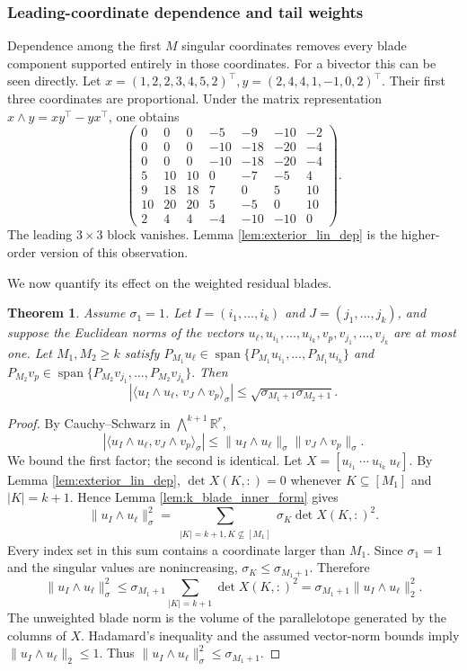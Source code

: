 \documentclass[11pt, preprint]{article}
\newtheorem{theorem}{Theorem}[section]
\newcommand{\R}{\mathbb{R}}
\newcommand{\inner}[1]{\langle #1\rangle}
\newcommand{\Span}{\operatorname{span}}
\begin{document}
\subsubsection{Leading-coordinate dependence and tail weights}

Dependence among the first $M$ singular coordinates removes every blade component supported entirely in those coordinates. For a bivector this can be seen directly. Let
\(
x=(1,2,2,3,4,5,2)^\top, 
y=(2,4,4,1,-1,0,2)^\top.
\)
Their first three coordinates are proportional. Under the matrix representation
$x\wedge y=xy^\top-yx^\top$, one obtains
\[
\begin{pmatrix}
0&0&0&-5&-9&-10&-2\\
0&0&0&-10&-18&-20&-4\\
0&0&0&-10&-18&-20&-4\\
5&10&10&0&-7&-5&4\\
9&18&18&7&0&5&10\\
10&20&20&5&-5&0&10\\
2&4&4&-4&-10&-10&0
\end{pmatrix}.
\]
The leading $3\times3$ block vanishes. Lemma \ref{lem:exterior_lin_dep} is the higher-order version of this observation.

We now quantify its effect on the weighted residual blades.

\begin{theorem}\label{thm:k_blade_inner_bound1}
Assume $\sigma_1=1$. Let $I=(i_1,\ldots,i_k)$ and $J=(j_1,\ldots,j_k)$, and suppose the Euclidean norms of the vectors
$u_\ell,u_{i_1},\ldots,u_{i_k},v_p,v_{j_1},\ldots,v_{j_k}$ are at most one. Let $M_1,M_2\geq k$ satisfy
\(P_{M_1}u_\ell\in\Span\{P_{M_1}u_{i_1},\ldots,P_{M_1}u_{i_k}\}\) and \(P_{M_2}v_p\in\Span\{P_{M_2}v_{j_1},\ldots,P_{M_2}v_{j_k}\}.\)
Then
\begin{equation}\label{eq:projected-dependence-bound}
\left|
\inner{u_I\wedge u_\ell,\,v_J\wedge v_p}_\sigma
\right|
\leq
\sqrt{\sigma_{M_1+1}\sigma_{M_2+1}}.
\end{equation}
\end{theorem}

\begin{proof}
By Cauchy--Schwarz in $\bigwedge^{k+1}\R^r$,
\[
\left|\inner{u_I\wedge u_\ell,v_J\wedge v_p}_\sigma\right|
\leq
\|u_I\wedge u_\ell\|_\sigma
\|v_J\wedge v_p\|_\sigma.
\]
We bound the first factor; the second is identical. Let
$X=[u_{i_1}\ \cdots\ u_{i_k}\ u_\ell]$. By Lemma \ref{lem:exterior_lin_dep},
$\det X(K,:)=0$ whenever $K\subseteq[M_1]$ and $|K|=k+1$. Hence Lemma \ref{lem:k_blade_inner_form} gives
\[
\|u_I\wedge u_\ell\|_\sigma^2
=
\sum_{\substack{|K|=k+1,K\nsubseteq[M_1]}}
\sigma_K\det X(K,:)^2.
\]
Every index set in this sum contains a coordinate larger than $M_1$. Since $\sigma_1=1$ and the singular values are nonincreasing,
$\sigma_K\leq\sigma_{M_1+1}$. Therefore
\[
\|u_I\wedge u_\ell\|_\sigma^2
\leq
\sigma_{M_1+1}
\sum_{|K|=k+1}\det X(K,:)^2
=
\sigma_{M_1+1}\|u_I\wedge u_\ell\|_2^2.
\]
The unweighted blade norm is the volume of the parallelotope generated by the columns of $X$. Hadamard's inequality and the assumed vector-norm bounds imply
$\|u_I\wedge u_\ell\|_2\leq1$. Thus
$\|u_I\wedge u_\ell\|_\sigma^2\leq\sigma_{M_1+1}$.
\end{proof}
\end{document}
